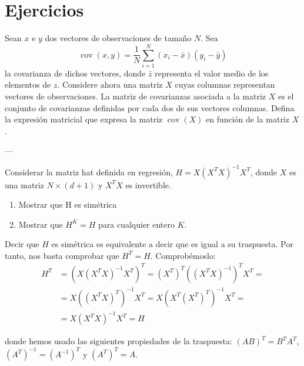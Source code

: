 \documentclass[a4paper, 11pt]{article}
\begin{document}
    \maketitle

    \section{Ejercicios}


      \begin{ejercicio}
        Sean $x$ e $y$ dos vectores de observaciones de tamaño $N$. Sea
        \[
        \operatorname{cov}(x,y)=\frac{1}{N}\sum_{i=1}^N (x_i-\bar{x})(y_i-\bar{y})
        \]
        la covarianza de dichos vectores, donde $\bar{z}$ representa el valor medio de los elementos de $z$. Considere ahora una matriz $X$ cuyas columnas representan vectores de observaciones. La matriz de covarianzas asociada a la matriz $X$ es el conjunto de covarianzas definidas por cada dos de sus vectores columnas. Defina la expresión matricial que expresa la matriz $\operatorname{cov}(X)$ en función de la matriz $X$.
      \end{ejercicio}

      \begin{solucion}
        ---
      \end{solucion}

      \begin{ejercicio}
        Considerar la matriz hat definida en regresión,  $H = X(X^TX)^{-1}X^T$, donde $X$ es una matriz  $N \times (d+1)$ y $X^TX$ es invertible.
        \begin{enumerate}
            \item Mostrar que H es simétrica
            \item Mostrar que $H^K=H$ para cualquier entero $K$.
        \end{enumerate}
      \end{ejercicio}

      \begin{solucion}
          Decir que $H$ es simétrica es equivalente a decir que es igual a su traspuesta. Por tanto, nos basta comprobar que $H^T = H$. Comprobémoslo:
          \begin{align*}
              H^T &= \left(X \left(X^TX\right)^{-1} X^T\right)^T = (X^T)^T \left(\left(X^TX\right)^{-1}\right)^T X^T = \\
              &= X \left(\left(X^TX\right)^T\right)^{-1} X^T = X \left(X^T \left(X^T\right)^T\right)^{-1} X^T = \\
              &= X (X^T X)^{-1} X^T = H
          \end{align*}
      \end{solucion}
      donde hemos usado las siguientes propiedades de la traspuesta: $(AB)^T = B^T A^T$, $(A^T)^{-1} = (A^{-1})^T$ y $(A^T)^T = A$.
\end{document}
